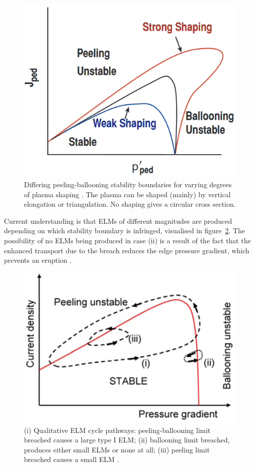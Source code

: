 \documentclass[11pt, twocolumn]{article}  %
\begin{document}
\begin{figure}
\includegraphics[scale=0.6]{Figures/PBshaping.PNG}
\centering
\caption{Differing peeling-ballooning stability boundaries for varying degrees of plasma shaping \cite{Snyder2004}. The plasma can be shaped (mainly) by vertical elongation or triangulation. No shaping gives a circular cross section.}\label{fig:PBshaping}
\end{figure}

Current understanding is that ELMs of different magnitudes are produced depending on which stability boundary is infringed, visualised in figure~\ref{fig:ELMcycles}. The possibility of no ELMs being produced in case (ii) is a result of the fact that the enhanced transport due to the breach reduces the edge pressure gradient, which prevents an eruption \cite{Wilson2006}.

\begin{figure}
\includegraphics[scale=0.7]{Figures/ELMcycles.PNG}
\centering
\caption{(i) Qualitative ELM cycle pathways: peeling-ballooning limit breached causes a large type I ELM; (ii) ballooning limit breached, produces either small ELMs or none at all; (iii) peeling limit breached causes a small ELM \cite{Wilson2006}.}\label{fig:ELMcycles}
\end{figure}
\end{document}
